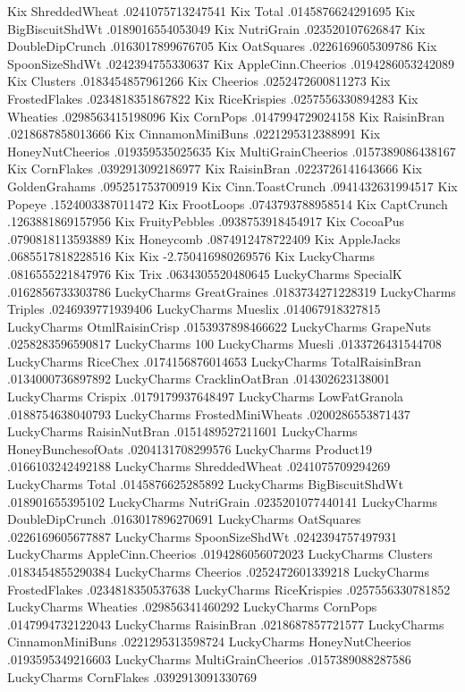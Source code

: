 Kix	ShreddedWheat	.0241075713247541
Kix	Total	.0145876624291695
Kix	BigBiscuitShdWt	.0189016554053049
Kix	NutriGrain	.023520107626847
Kix	DoubleDipCrunch	.0163017899676705
Kix	OatSquares	.0226169605309786
Kix	SpoonSizeShdWt	.0242394755330637
Kix	AppleCinn.Cheerios	.0194286053242089
Kix	Clusters	.0183454857961266
Kix	Cheerios	.0252472600811273
Kix	FrostedFlakes	.0234818351867822
Kix	RiceKrispies	.0257556330894283
Kix	Wheaties	.0298563415198096
Kix	CornPops	.0147994729024158
Kix	RaisinBran	.0218687858013666
Kix	CinnamonMiniBuns	.0221295312388991
Kix	HoneyNutCheerios	.019359535025635
Kix	MultiGrainCheerios	.0157389086438167
Kix	CornFlakes	.0392913092186977
Kix	RaisinBran	.0223726141643666
Kix	GoldenGrahams	.095251753700919
Kix	Cinn.ToastCrunch	.0941432631994517
Kix	Popeye	.1524003387011472
Kix	FrootLoops	.0743793788958514
Kix	CaptCrunch	.1263881869157956
Kix	FruityPebbles	.0938753918454917
Kix	CocoaPus	.0790818113593889
Kix	Honeycomb	.0874912478722409
Kix	AppleJacks	.0685517818228516
Kix	Kix	-2.750416980269576
Kix	LuckyCharms	.0816555221847976
Kix	Trix	.0634305520480645
LuckyCharms	SpecialK	.0162856733303786
LuckyCharms	GreatGraines	.0183734271228319
LuckyCharms	Triples	.0246939771939406
LuckyCharms	Mueslix	.014067918327815
LuckyCharms	OtmlRaisinCrisp	.0153937898466622
LuckyCharms	GrapeNuts	.0258283596590817
LuckyCharms	100%
LuckyCharms	Muesli	.0133726431544708
LuckyCharms	RiceChex	.0174156876014653
LuckyCharms	TotalRaisinBran	.0134000736897892
LuckyCharms	CracklinOatBran	.014302623138001
LuckyCharms	Crispix	.0179179937648497
LuckyCharms	LowFatGranola	.0188754638040793
LuckyCharms	FrostedMiniWheats	.0200286553871437
LuckyCharms	RaisinNutBran	.0151489527211601
LuckyCharms	HoneyBunchesofOats	.0204131708299576
LuckyCharms	Product19	.0166103242492188
LuckyCharms	ShreddedWheat	.0241075709294269
LuckyCharms	Total	.0145876625285892
LuckyCharms	BigBiscuitShdWt	.018901655395102
LuckyCharms	NutriGrain	.0235201077440141
LuckyCharms	DoubleDipCrunch	.0163017896270691
LuckyCharms	OatSquares	.0226169605677887
LuckyCharms	SpoonSizeShdWt	.0242394757497931
LuckyCharms	AppleCinn.Cheerios	.0194286056072023
LuckyCharms	Clusters	.0183454855290384
LuckyCharms	Cheerios	.0252472601339218
LuckyCharms	FrostedFlakes	.0234818350537638
LuckyCharms	RiceKrispies	.0257556330781852
LuckyCharms	Wheaties	.029856341460292
LuckyCharms	CornPops	.0147994732122043
LuckyCharms	RaisinBran	.0218687857721577
LuckyCharms	CinnamonMiniBuns	.0221295313598724
LuckyCharms	HoneyNutCheerios	.0193595349216603
LuckyCharms	MultiGrainCheerios	.0157389088287586
LuckyCharms	CornFlakes	.0392913091330769

